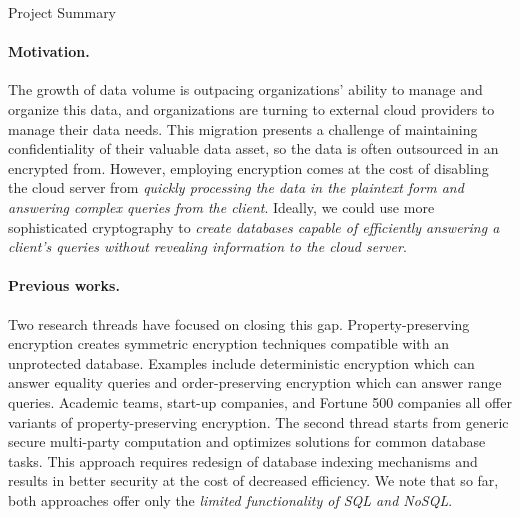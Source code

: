 \documentclass[11pt]{article}
\begin{document}
\begin{center}
\LARGE
Project Summary 
\end{center}

\vspace{-1em}
\noindent \hrulefill



\paragraph{Motivation.}
%
The growth of data volume is outpacing organizations' ability to manage and
organize this data, and organizations are turning to external cloud providers
to manage their data needs.  
%
This migration presents a challenge of maintaining confidentiality of their
valuable data asset, so the data is often outsourced in an encrypted from. 
%
However, employing encryption comes at the cost of disabling the cloud server
from {\em quickly processing the data in the plaintext form and answering
complex queries from the client}. 
%
Ideally, we could use more sophisticated cryptography to {\em create databases
capable of efficiently answering a client's queries without revealing
information to the cloud server}.  

\paragraph{Previous works.}
Two research threads have focused on closing this gap.
Property-preserving encryption creates symmetric encryption techniques
compatible with an unprotected database. Examples include deterministic
encryption which can answer equality queries and order-preserving encryption
which can answer range queries. Academic teams, start-up companies, and Fortune
500 companies all offer variants of property-preserving encryption.
%
The second thread starts from generic secure multi-party computation and
optimizes solutions for common database tasks. This approach requires redesign
of database indexing mechanisms and results in better security at the cost of
decreased efficiency. 
%
We note that so far, both approaches offer only the {\em limited functionality
of SQL and NoSQL}. 
\end{document}
